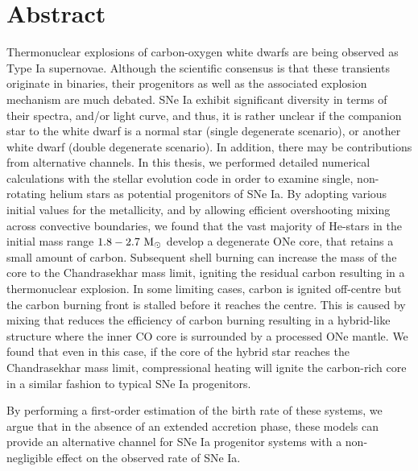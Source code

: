 \documentclass[../main/thesis_msc.tex]{subfiles}
\begin{document}
\chapter*{Abstract}

Thermonuclear explosions of carbon-oxygen white dwarfs are being observed as Type Ia supernovae. 
Although the scientific consensus is that  these transients originate in binaries, their progenitors as well as the associated explosion mechanism are much debated. 
 SNe Ia exhibit significant diversity in terms of their spectra, and/or light curve, and thus, it is rather unclear if the companion star to the white dwarf is a normal star (single degenerate scenario), or another white dwarf (double degenerate scenario). In addition, there may be contributions from alternative channels. In this thesis, we performed detailed numerical calculations with the \mesa stellar evolution code in order to examine single, non-rotating helium stars as potential progenitors of SNe Ia. By adopting various initial values for the metallicity, and by allowing efficient overshooting mixing across convective boundaries, we found that the vast majority of He-stars in the initial mass range $\rm 1.8-2.7 \ M_{\odot}$ develop a degenerate ONe core, that retains a small amount of carbon. Subsequent shell burning can increase the mass of the core to the Chandrasekhar mass limit, igniting the residual carbon resulting in a thermonuclear explosion. In some limiting cases, carbon is ignited off-centre but the carbon burning front is stalled before it reaches the centre. This is caused by mixing that reduces the efficiency of carbon burning resulting in a hybrid-like structure where the inner CO core is surrounded by a processed ONe mantle. We found that even in this case, if the core of the hybrid star reaches the Chandrasekhar mass limit, compressional heating will ignite the carbon-rich core in a similar fashion to typical SNe Ia progenitors.

By performing a first-order estimation of the birth rate of these systems, we argue that in the absence of an extended accretion phase, these models can provide an alternative channel for SNe Ia progenitor systems with a non-negligible effect on the observed rate of SNe Ia.
\end{document}
